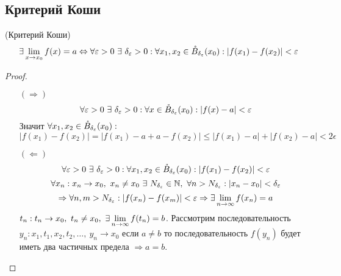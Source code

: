     \subsection{Критерий Коши}
        \begin{theorem} (Критерий Коши)
            \[\exists \lim\limits_{x\to x_0}f(x)=a \Leftrightarrow \forall \epsilon>0\ \exists\ \delta_{\epsilon}>0: \forall x_1,x_2\in \Bo_{\delta_{\epsilon}}(x_0): |f(x_1)-f(x_2)|<\epsilon\]
        \end{theorem} 
        \begin{proof}\tab
            \begin{itemize}
                \item[$(\Rightarrow)$] \[\forall \epsilon>0\ \exists\ \delta_{\epsilon}>0: \forall x\in \Bo_{\delta_{\epsilon}}(x_0): |f(x)-a|<\epsilon\]
                Значит $\forall x_1,x_2\in \mathring{B}_{\delta_{\varepsilon}}(x_0):$
                \[|f(x_1)-f(x_2)|=|f(x_1)-a+a-f(x_2)|\leq|f(x_1)-a|+|f(x_2)-a|<2\epsilon\]
                \item[$(\Leftarrow)$] \[\forall \epsilon>0\ \exists\ \delta_{\epsilon}>0: \forall x_1,x_2\in \Bo_{\delta_{\epsilon}}(x_0): |f(x_1)-f(x_2)|<\epsilon\]
                \[\forall x_n: x_n\to x_0,\ x_n\ne x_0\ \exists\ N_{\delta_{\epsilon}}\in \N,\ \forall n> N_{\delta_{\epsilon}}: |x_n-x_0|<\delta_{\epsilon}\]
                \[\Rightarrow \forall n,m>N_{\delta_{\varepsilon}}: |f(x_n)-f(x_m)|<\varepsilon \Rightarrow \exists\lim\limits_{n\to \infty} f(x_n)=a\]
                $t_n: t_n\to x_0,\ t_n\ne x_0,\ \exists \lim\limits_{n\to \infty} f(t_n)=b$. Рассмотрим последовательность $y_n: x_1, t_1, x_2, t_2, \dots,\ y_n\to x_0$ если $a\ne b$ то последовательность $f(y_n)$  будет иметь два частичных предела $\Rightarrow a=b$.
            \end{itemize}
        \end{proof} 
\newpage